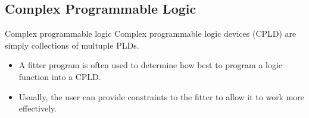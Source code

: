 \subsection {Complex Programmable Logic}

\begin{frame}{Complex programmable logic}
  Complex programmable logic devices (CPLD) are simply collections of multuple PLDs.
  \begin{itemize}
    \item A \alert{fitter} program is often used to determine how best to program a logic function into a CPLD.
    \item Usually, the user can provide constraints to the fitter to allow it to work more effectively.
  \end{itemize}
\end{frame}


